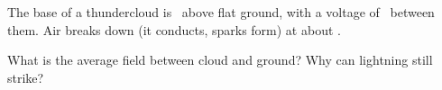 The base of a thundercloud is \hcO\ above flat ground, with a voltage of \UO\ between them. Air breaks down (it conducts, sparks form) at about \EbO.

\begin{abcliste}
\abc What is the average field between cloud and ground?
\abc Why can lightning still strike?
\end{abcliste}

